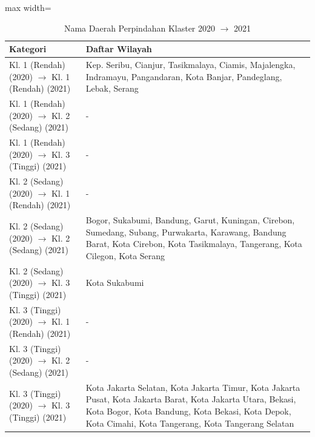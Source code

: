 \begin{table}[H]
\centering
\caption{Nama Daerah Perpindahan Klaster 2020 \(\rightarrow\) 2021} \label{tab:apptransname2020x2021}
\begin{adjustbox}{max width=\textwidth}
\begin{tabular}{|p{4cm}|p{10cm}|}
\hline
\textbf{Kategori} & \textbf{Daftar Wilayah} \\
\hline
Kl. 1 (Rendah) (2020) \(\rightarrow\) Kl. 1 (Rendah) (2021) & Kep. Seribu, Cianjur, Tasikmalaya, Ciamis, Majalengka, Indramayu, Pangandaran, Kota Banjar, Pandeglang, Lebak, Serang \\
\hline
Kl. 1 (Rendah) (2020) \(\rightarrow\) Kl. 2 (Sedang) (2021) & - \\
\hline
Kl. 1 (Rendah) (2020) \(\rightarrow\) Kl. 3 (Tinggi) (2021) & - \\
\hline
Kl. 2 (Sedang) (2020) \(\rightarrow\) Kl. 1 (Rendah) (2021) & - \\
\hline
Kl. 2 (Sedang) (2020) \(\rightarrow\) Kl. 2 (Sedang) (2021) & Bogor, Sukabumi, Bandung, Garut, Kuningan, Cirebon, Sumedang, Subang, Purwakarta, Karawang, Bandung Barat, Kota Cirebon, Kota Tasikmalaya, Tangerang, Kota Cilegon, Kota Serang \\
\hline
Kl. 2 (Sedang) (2020) \(\rightarrow\) Kl. 3 (Tinggi) (2021) & Kota Sukabumi \\
\hline
Kl. 3 (Tinggi) (2020) \(\rightarrow\) Kl. 1 (Rendah) (2021) & - \\
\hline
Kl. 3 (Tinggi) (2020) \(\rightarrow\) Kl. 2 (Sedang) (2021) & - \\
\hline
Kl. 3 (Tinggi) (2020) \(\rightarrow\) Kl. 3 (Tinggi) (2021) & Kota Jakarta Selatan, Kota Jakarta Timur, Kota Jakarta Pusat, Kota Jakarta Barat, Kota Jakarta Utara, Bekasi, Kota Bogor, Kota Bandung, Kota Bekasi, Kota Depok, Kota Cimahi, Kota Tangerang, Kota Tangerang Selatan \\
\hline
\end{tabular}
\end{adjustbox}
\end{table}